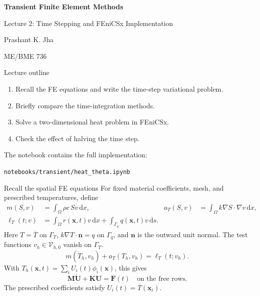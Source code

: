 \documentclass[11pt,aspectratio=169]{beamer}
\newcommand{\dd}{\mathrm d}
\newcommand{\bx}{\bm x}
\newcommand{\bU}{\bm U}
\newcommand{\bM}{\bm M}
\newcommand{\bK}{\bm K}
\newcommand{\bF}{\bm F}
\newcommand{\Vhzero}{\mathcal V_{h,0}}
\begin{document}
\begin{frame}
\centering\vfill
{\LARGE\bfseries Transient Finite Element Methods\par}
\vspace{0.45cm}
{\Large Lecture 2: Time Stepping and FEniCSx Implementation\par}
\vspace{0.45cm}
Prashant K. Jha\par
ME/BME 736
\vfill
\end{frame}

\begin{frame}{Lecture outline}
\begin{enumerate}
\item Recall the FE equations and write the time-step variational problem.
\item Briefly compare the time-integration methods.
\item Solve a two-dimensional heat problem in FEniCSx.
\item Check the effect of halving the time step.
\end{enumerate}
\medskip
The notebook contains the full implementation:
\begin{center}
\texttt{notebooks/transient/heat\_theta.ipynb}
\end{center}
\end{frame}

\begin{frame}{Recall the spatial FE equations}
For fixed material coefficients, mesh, and prescribed temperatures, define
\[
\begin{aligned}
m(S,v)&=\int_\Omega\rho c\,Sv\,\dd x,&
a_T(S,v)&=\int_\Omega k\nabla S\cdot\nabla v\,\dd x,\\
\ell_T(t;v)&=\int_\Omega r(\bx,t)v\,\dd x
+\int_{\Gamma_q}q(\bx,t)v\,\dd s.
\end{aligned}
\]
Here $T=\overline T$ on $\Gamma_T$, $k\nabla T\cdot\bm n=q$ on $\Gamma_q$,
and $\bm n$ is the outward unit normal.
The test functions $v_h\in\Vhzero$ vanish on $\Gamma_T$.
\[
m(\dot T_h,v_h)+a_T(T_h,v_h)=\ell_T(t;v_h).
\]
With $T_h(\bx,t)=\sum_iU_i(t)\phi_i(\bx)$, this gives
\[
\bM\dot{\bU}+\bK\bU=\bF(t)
\quad\text{on the free rows.}
\]
The prescribed coefficients satisfy $U_i(t)=\overline T(\bx_i)$.
\end{frame}
\end{document}
